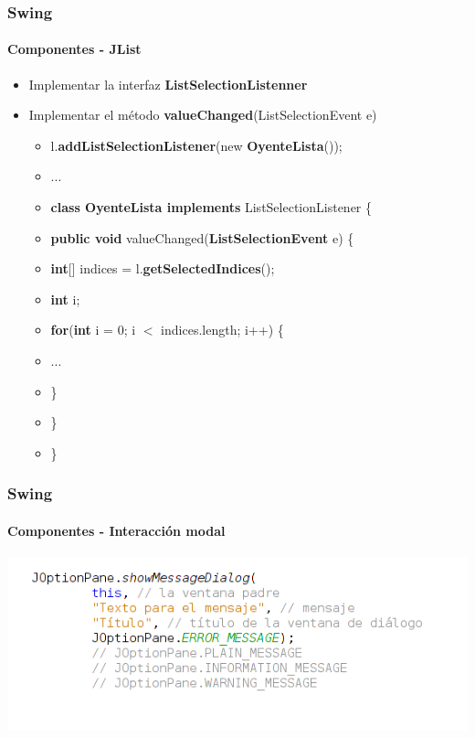 \documentclass{beamer}
\begin{document}
    \begin{frame}
		\frametitle{Swing}
		\framesubtitle{Componentes - JList}

        \begin{itemize}
		    \item[\checkmark] Implementar la interfaz \textbf{ListSelectionListenner}
		    \item[\checkmark] Implementar el m\'etodo \textbf{valueChanged}(ListSelectionEvent e)
		    \begin{itemize}
        		    \item[] l.\textbf{addListSelectionListener}(new \textbf{OyenteLista}());
	    	        \item[] ...
    	    	        \item[] \textbf{class OyenteLista implements} ListSelectionListener \{
	    	        \item[] \hspace{10pt} \textbf{public void} valueChanged(\textbf{ListSelectionEvent} e) \{
	    	        \item[] \hspace{20pt} \textbf{int}[] indices = l.\textbf{getSelectedIndices}();
	    	        \item[] \hspace{20pt} \textbf{int} i;
	    	        \item[] \hspace{20pt} \textbf{for}(\textbf{int} i = 0; i $<$ indices.length; i++) \{
                \item[] \hspace{30pt} ...
                \item[] \hspace{20pt} \}
                \item[] \hspace{10pt} \}
                \item[] \}
            \end{itemize}
		\end{itemize}
	\end{frame}

    \begin{frame}
		\frametitle{Swing}
		\framesubtitle{Componentes - Interacci\'on modal}

        \begin{center}
	        	\includegraphics[scale=.7]{images/dialog.png}
	    \end{center}
	\end{frame}
\end{document}
